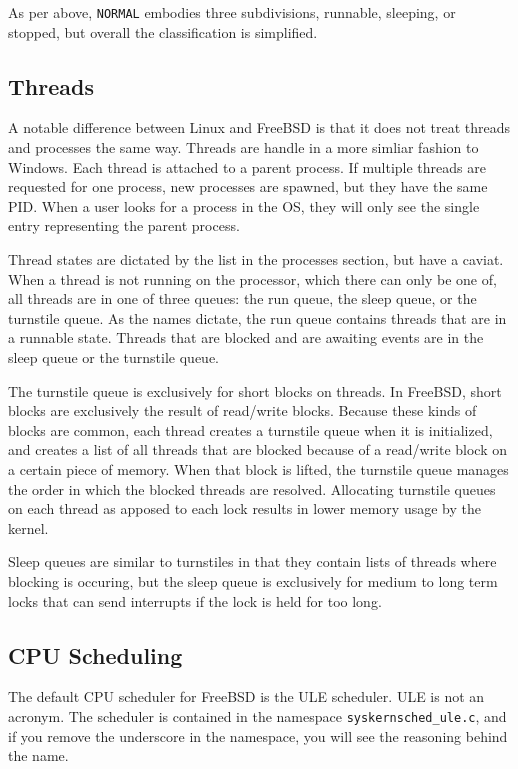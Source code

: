 \documentclass[10pt,letterpaper,onecolumn,draftclsnofoot]{IEEEtran}
\begin{document}
As per above, \texttt{NORMAL} embodies three subdivisions, runnable, sleeping,
or stopped, but overall the classification is simplified. \cite{kirkgeorgebsd}

  \subsection{Threads}
A notable difference between Linux and FreeBSD is that it does not treat threads
and processes the same way. Threads are handle in a more simliar fashion to Windows.
Each thread is attached to a parent process. If multiple threads are requested
for one process, new processes are spawned, but they have the same PID. When a
user looks for a process in the OS, they will only see the single entry representing
the parent process.

Thread states are dictated by the list in the processes section, but have a caviat.
When a thread is not running on the processor, which there can only be one of,
all threads are in one of three queues: the run queue, the sleep queue, or the
turnstile queue. As the names dictate, the run queue contains threads that are
in a runnable state. Threads that are blocked and are awaiting events are in the
sleep queue or the turnstile queue.

The turnstile queue is exclusively for short blocks on threads. In FreeBSD, short
blocks are exclusively the result of read/write blocks. Because these kinds of
blocks are common, each thread creates a turnstile queue when it is initialized,
and creates a list of all threads that are blocked because of a read/write block
on a certain piece of memory. When that block is lifted, the turnstile queue manages
the order in which the blocked threads are resolved. Allocating turnstile queues
on each thread as apposed to each lock results in lower memory usage by the kernel.

Sleep queues are similar to turnstiles in that they contain lists of threads
where blocking is occuring, but the sleep queue is exclusively for medium to long
term locks that can send interrupts if the lock is held for too long. \cite{kirkgeorgebsd}
  \subsection{CPU Scheduling}
The default CPU scheduler for FreeBSD is the ULE scheduler. ULE is not an acronym.
\cite{kirkgeorgebsd} The scheduler is contained in the namespace
\texttt{\/sys\/kern\/sched\_ule.c}, and if you remove the underscore in the namespace,
you will see the reasoning behind the name.
\end{document}
